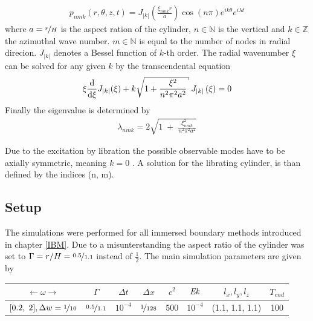 \begin{align}
    p_{nmk}(r, \theta, z, t) = J_{|k|}\left(\frac{\xi_{nmk}r}{a} \right)\cos(n\pi)e^{ik\theta}e^{i\lambda t}
\end{align}
where $a=\nicefrac{r}{H}$ is the aspect ration of the cylinder,
$n\in\mathbb{N}$ is the vertical and $k\in\mathbb{Z}$ the azimuthal wave number.
$m\in\mathbb{N}$ is equal to the number of nodes in radial direcion.
$J_{|k|}$ denotes a Bessel function of $k$-th order.
The radial wavenumber $\xi$  can be solved for any given $k$ by the transcendental equation
\begin{align}
    \xi \frac{\dif}{\dif \xi}J_{|k|}(\xi) + k \sqrt{1 + \frac{\xi^2}{n^2\pi^2a^2}} \; J_{|k|}\left(\xi\right) = 0
\end{align}
Finally the eigenvalue is determined by
\begin{align}
    \lambda_{nmk} = 2\sqrt{1 \; + \;\frac{ \xi_{nmk}^2}{n^2\pi^2a^2}}
\end{align}

Due to the excitation by libration the possible observable modes have to be axially symmetric, meaning $k=0$ \citep{}.
A solution for the librating cylinder, is than defined by the indices (n, m).\\

\subsection{Setup}

The simulations were performed for all immersed boundary methods introduced in chapter \ref{IBM}.
Due to a misunterstanding the aspect ratio of the cylinder was set to $\Gamma=r/H=\nicefrac{0.5}{1.1}$ instead of $\frac{1}{2}$.
The main simulation parameters are given by

\begin{center}
\vspace*{0.7ex}
\begin{tabular}{c|c|c|c|c|c|c|c }
 $\leftarrow  \omega \rightarrow $ & $\Gamma$ & $\Delta t$ & $\Delta x$ & $c^2$ & $\mbox{\textit{Ek}}$  & $l_x, l_y, l_z$ & $T_{end}$\\
\hline
 $[0.2,\; 2], \Delta w = \nicefrac{1}{10}$ & $\nicefrac{0.5}{1.1}$ & $10^{-4}$ & $\nicefrac{1}{128}$ & 500 & $10^{-4}$  & (1.1, 1.1, 1.1) & 100\\
\end{tabular}
\vspace*{0.7ex}
\end{center}
\newpage

